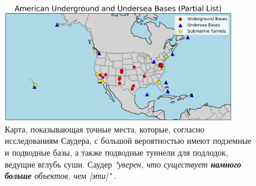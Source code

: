 \documentclass[10pt,twocolumn,letterpaper]{article}
\begin{document}
\begin{figure}[t]
\begin{center}
\includegraphics[width=0.9\textwidth]{basescrop.png}
\end{center}
   \caption{Карта, показывающая точные места, которые, согласно исследованиям Саудера, с большой вероятностью имеют подземные и подводные базы, а также подводные туннели для подлодок, ведущие вглубь суши. Саудер \textit{"уверен, что существует \textbf{намного больше} объектов, чем [эти]"} \cite{22}.}
   \label{fig:4}
\end{figure}
\end{document}
